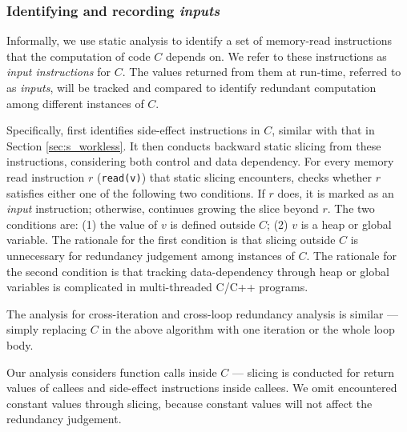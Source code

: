 \subsubsection{Identifying and recording \textit{inputs}}
\label{sec:dependence}

Informally, we use static analysis to identify a set of 
memory-read instructions that the computation of code $C$
depends on. We refer
to these instructions as \textit{input instructions} for $C$. 
The values returned
from them at run-time, referred to as \textit{inputs}, 
will be tracked and compared to identify
redundant computation among different instances of $C$.

Specifically, \Tool first identifies side-effect instructions in $C$,
similar with that in Section \ref{sec:s_workless}. 
It then conducts 
backward static slicing 
from these instructions, considering both control and data
dependency. For every memory read instruction $r$ 
(\texttt{read(v)}) that static slicing encounters, \Tool checks whether $r$
satisfies either one of the following two conditions. 
If $r$ does, it is marked as
an \textit{input} instruction; otherwise, \Tool continues growing the
slice beyond $r$.
The two conditions are:
(1) the value of $v$ is defined outside $C$;
(2) $v$ is a heap or global variable.
The rationale for the first condition is that slicing outside $C$ is
unnecessary for redundancy judgement among instances of $C$.
The rationale for the second condition is that tracking data-dependency
through heap or global variables is complicated in multi-threaded C/C++
programs.

The analysis for cross-iteration and cross-loop redundancy analysis is similar
--- simply replacing $C$ in the above algorithm with one iteration or
the whole loop body.


Our analysis considers function calls inside $C$ --- slicing is conducted
for return values of callees and side-effect instructions
inside callees. 
We omit encountered constant values through slicing, because constant values will not affect the redundancy judgement. 

